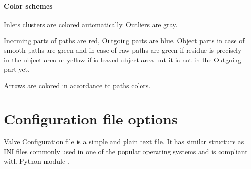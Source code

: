 \documentclass[a4paper,10pt,english]{sphinxmanual}
\begin{document}
\subsubsection{Color schemes}
\label{valve/valve_manual:color-schemes}
Inlets clusters are colored automatically. Outliers are gray.

Incoming parts of paths are red, Outgoing parts are blue. Object parts in case of smooth paths are green and in case of raw paths are green if residue is precisely in the object area or yellow if is leaved object area but it is not in the Outgoing part yet.

Arrows are colored in accordance to paths colors.


\chapter{Configuration file options}
\label{valve/valve_config::doc}\label{valve/valve_config:configuration-file-options}
Valve Configuration file is a simple and plain text file. It has similar structure as INI files commonly used in one of the popular operating systems and is compliant with Python module \href{https://docs.python.org/2/library/configparser.html\#module-ConfigParser}{}.
\end{document}
